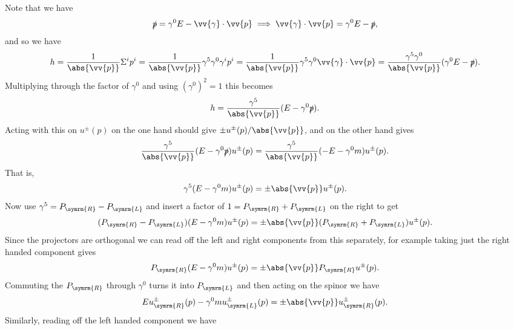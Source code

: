\documentclass[fleqn]{NotesClass}
\newcommand{\Left}{\symrm{L}}
\newcommand{\Right}{\symrm{R}}
\begin{document}
    Note that we have
    \begin{equation}
        \slashed{p} = \gamma^0E - \vv{\gamma} \cdot \vv{p} \implies \vv{\gamma} \cdot \vv{p} = \gamma^0 E - \slashed{p},
    \end{equation}
    and so we have
    \begin{equation}
        h = \frac{1}{\abs{\vv{p}}}\Sigma^ip^i = \frac{1}{\abs{\vv{p}}}\gamma^5\gamma^0\gamma^ip^i = \frac{1}{\abs{\vv{p}}}\gamma^5\gamma^0 \vv{\gamma} \cdot \vv{p} = \frac{\gamma^5\gamma^0}{\abs{\vv{p}}}(\gamma^0E - \slashed{p}).
    \end{equation}
    Multiplying through the factor of \(\gamma^0\) and using \((\gamma^0)^2 = 1\) this becomes
    \begin{equation}
        h = \frac{\gamma^5}{\abs{\vv{p}}} (E - \gamma^0\slashed{p}).
    \end{equation}
    Acting with this on \(u^{\pm}(p)\) on the one hand should give \(\pm u^{\pm}(p)/\abs{\vv{p}}\), and on the other hand gives
    \begin{equation}
        \frac{\gamma^5}{\abs{\vv{p}}}(E - \gamma^0\slashed{p})u^{\pm}(p) = \frac{\gamma^5}{\abs{\vv{p}}}(-E - \gamma^0m)u^{\pm}(p).
    \end{equation}
    That is,
    \begin{equation}
        \gamma^5(E - \gamma^0m)u^{\pm}(p) = \pm\abs{\vv{p}}u^{\pm}(p).
    \end{equation}
    Now use \(\gamma^5 = P_{\Right} - P_{\Left}\) and insert a factor of \(1 = P_{\Right} + P_{\Left}\) on the right to get
    \begin{equation}
        (P_{\Right} - P_{\Left})(E - \gamma^0m)u^{\pm}(p) = \pm\abs{\vv{p}}(P_{\Right} + P_{\Left})u^{\pm}(p).
    \end{equation}
    Since the projectors are orthogonal we can read off the left and right components from this separately, for example taking just the right handed component gives
    \begin{equation}
        P_{\Right}(E - \gamma^0m)u^{\pm}(p) = \pm\abs{\vv{p}}P_{\Right}u^{\pm}(p).
    \end{equation}
    Commuting the \(P_{\Right}\) through \(\gamma^0\) turns it into \(P_{\Left}\) and then acting on the spinor we have
    \begin{equation}
        Eu^{\pm}_{\Right}(p) - \gamma^0mu^{\pm}_{\Left}(p) = \pm\abs{\vv{p}}u^{\pm}_{\Right}(p).
    \end{equation}
    Similarly, reading off the left handed component we have
\end{document}
